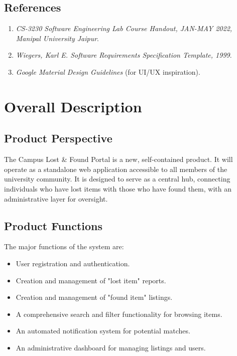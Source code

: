 \documentclass[11pt, a4paper]{article}
\begin{document}
\subsection{References}
\begin{enumerate}
    \item \textit{CS-3230 Software Engineering Lab Course Handout, JAN-MAY 2022, Manipal University Jaipur}.
    \item \textit{Wiegers, Karl E. Software Requirements Specification Template, 1999}.
    \item \textit{Google Material Design Guidelines} (for UI/UX inspiration).
\end{enumerate}

\section{Overall Description}

\subsection{Product Perspective}
The Campus Lost \& Found Portal is a new, self-contained product. It will operate as a standalone web application accessible to all members of the university community. It is designed to serve as a central hub, connecting individuals who have lost items with those who have found them, with an administrative layer for oversight.

\subsection{Product Functions}
The major functions of the system are:
\begin{itemize}
    \item User registration and authentication.
    \item Creation and management of "lost item" reports.
    \item Creation and management of "found item" listings.
    \item A comprehensive search and filter functionality for browsing items.
    \item An automated notification system for potential matches.
    \item An administrative dashboard for managing listings and users.
\end{itemize}
\end{document}
